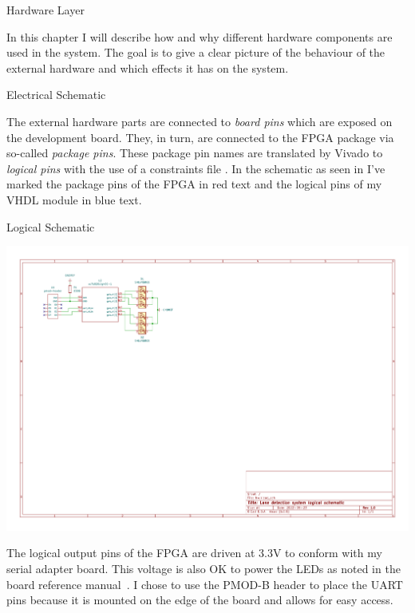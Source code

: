 \documentclass{matthijs}
\begin{document}
	\begin{hoofdstuk}{Hardware Layer}

		In this chapter I will describe how and why different hardware components are used in the system.
		The goal is to give a clear picture of the behaviour of the external hardware and which effects it has on the system.

		\begin{paragraaf}{Electrical Schematic}

			The external hardware parts are connected to \textit{board pins} which are exposed on the development board.
			They, in turn, are connected to the FPGA package via so-called \textit{package pins}.
			These package pin names are translated by Vivado to \textit{logical pins} with the use of a constraints file \cite{xilinxug865}.
			In the schematic as seen in  I've marked the package pins of the FPGA in red text and the logical pins of my VHDL module in blue text.

			\begin{figuur}{Logical Schematic}
				\centerline{
					\includegraphics[width=1\textwidth, clip, trim=2.0cm 13.9cm 17.4cm 2.3cm]{hw/hw.pdf/hw.pdf}
				}
				\vspace{-2ex}
			\end{figuur}
			\vspace{-0.8ex}

			The logical output pins of the FPGA are driven at 3.3V to conform with my serial adapter board.
			This voltage is also OK to power the LEDs as noted in the board reference manual~\cite{tul2018pynq}.
			I chose to use the PMOD-B header to place the UART pins because it is mounted on the edge of the board and allows for easy access.
			

\end{paragraaf}
\end{hoofdstuk}
\end{document}
